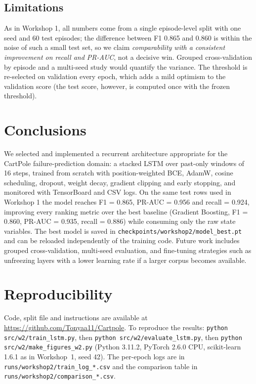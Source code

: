 \documentclass[conference]{IEEEtran}
\begin{document}
\subsection{Limitations}
As in Workshop 1, all numbers come from a single episode-level split with one
seed and 60 test episodes; the difference between F1 0.865 and 0.860 is within
the noise of such a small test set, so we claim \emph{comparability with a
consistent improvement on recall and PR-AUC}, not a decisive win. Grouped
cross-validation by episode and a multi-seed study would quantify the
variance. The threshold is re-selected on validation every epoch, which adds
a mild optimism to the validation score (the test score, however, is computed
once with the frozen threshold).

\section{Conclusions}
We selected and implemented a recurrent architecture appropriate for the
CartPole failure-prediction domain: a stacked LSTM over past-only windows of
16 steps, trained from scratch with position-weighted BCE, AdamW, cosine
scheduling, dropout, weight decay, gradient clipping and early stopping, and
monitored with TensorBoard and CSV logs. On the same test rows used in
Workshop 1 the model reaches F1 = 0.865, PR-AUC = 0.956 and recall = 0.924,
improving every ranking metric over the best baseline (Gradient Boosting,
F1 = 0.860, PR-AUC = 0.935, recall = 0.886) while consuming only the raw
state variables. The best model is saved in
\texttt{checkpoints/workshop2/model\_best.pt} and can be reloaded independently of the
training code. Future work includes grouped cross-validation, multi-seed
evaluation, and fine-tuning strategies such as unfreezing layers with a lower
learning rate if a larger corpus becomes available.

\section*{Reproducibility}
Code, split file and instructions are available at
\url{https://github.com/Tonyaa11/Cartpole}. To reproduce the results:
\texttt{python src/w2/train\_lstm.py}, then \texttt{python src/w2/evaluate\_lstm.py}, then
\texttt{python src/w2/make\_figures\_w2.py} (Python 3.11.2, PyTorch 2.6.0 CPU,
scikit-learn 1.6.1 as in Workshop~1, seed 42). The per-epoch logs are in
\texttt{runs/workshop2/train\_log\_*.csv} and the comparison table in
\texttt{runs/workshop2/comparison\_*.csv}.
\end{document}
